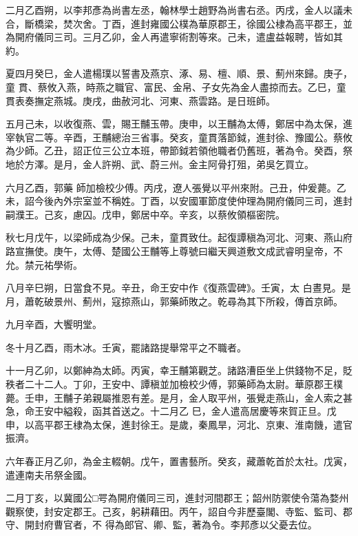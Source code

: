 \begin{pinyinscope}
 二月乙酉朔，以李邦彥為尚書左丞，翰林學士趙野為尚書右丞。丙戌，金人以議未合，斷橋梁，焚次舍。丁酉，進封雍國公樸為華原郡王，徐國公棣為高平郡王，並為開府儀同三司。三月乙卯，金人再遣寧術割等來。己未，遣盧益報聘，皆如其約。



 夏四月癸巳，金人遣楊璞以誓書及燕京、涿、易、檀、順、景、薊州來歸。庚子，童
 貫、蔡攸入燕，時燕之職官、富民、金帛、子女先為金人盡掠而去。乙巳，童貫表奏撫定燕城。庚戌，曲赦河北、河東、燕雲路。是日班師。



 五月己未，以收復燕、雲，賜王黼玉帶。庚申，以王黼為太傅，鄭居中為太保，進宰執官二等。辛酉，王黼總治三省事。癸亥，童貫落節鉞，進封徐、豫國公。蔡攸為少師。乙丑，詔正位三公立本班，帶節鉞若領他職者仍舊班，著為令。癸酉，祭地於方澤。是月，金人許朔、武、蔚三州。金主阿骨打殂，弟吳乞買立。



 六月乙酉，郭藥
 師加檢校少傅。丙戌，遼人張覺以平州來附。己丑，仲爰薨。乙未，詔今後內外宗室並不稱姓。丁酉，以安國軍節度使仲理為開府儀同三司，進封嗣濮王。己亥，慮囚。戊申，鄭居中卒。辛亥，以蔡攸領樞密院。



 秋七月戊午，以梁師成為少保。己未，童貫致仕。起復譚稹為河北、河東、燕山府路宣撫使。庚午，太傅、楚國公王黼等上尊號曰繼天興道敷文成武睿明皇帝，不允。禁元祐學術。



 八月辛巳朔，日當食不見。辛丑，命王安中作《復燕雲碑》。壬寅，太
 白晝見。是月，蕭乾破景州、薊州，寇掠燕山，郭藥師敗之。乾尋為其下所殺，傳首京師。



 九月辛酉，大饗明堂。



 冬十月乙酉，雨木冰。壬寅，罷諸路提舉常平之不職者。



 十一月乙卯，以鄭紳為太師。丙寅，幸王黼第觀芝。諸路漕臣坐上供錢物不足，貶秩者二十二人。丁卯，王安中、譚稹並加檢校少傅，郭藥師為太尉。華原郡王樸薨。壬申，王黼子弟親屬推恩有差。是月，金人取平州，張覺走燕山，金人索之甚急，命王安中縊殺，函其首送之。十二月乙
 巳，金人遣高居慶等來賀正旦。戊申，以高平郡王棣為太保，進封徐王。是歲，秦鳳旱，河北、京東、淮南饑，遣官振濟。



 六年春正月乙卯，為金主輟朝。戊午，置書藝所。癸亥，藏蕭乾首於太社。戊寅，遣連南夫吊祭金國。



 二月丁亥，以冀國公□咢為開府儀同三司，進封河間郡王；韶州防禦使令蕩為婺州觀察使，封安定郡王。己亥，躬耕藉田。丙午，詔自今非歷臺閣、寺監、監司、郡守、開封府曹官者，不
 得為郎官、卿、監，著為令。李邦彥以父憂去位。




\end{pinyinscope}
